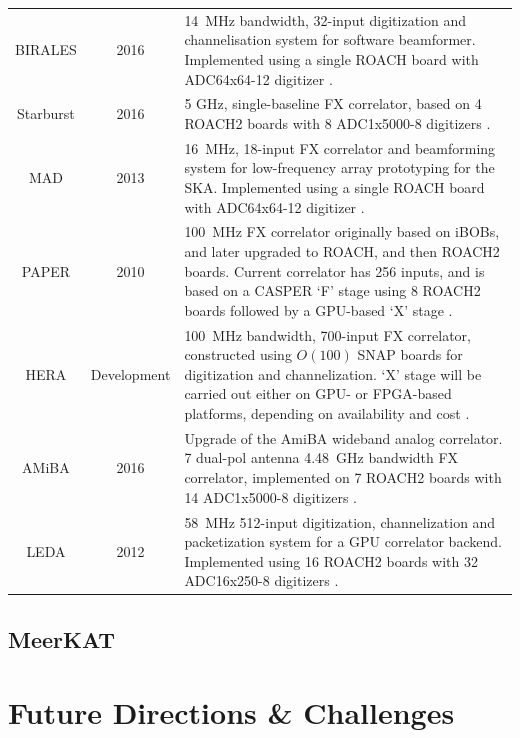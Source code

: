 \documentclass{ws-jai}
\begin{document}
\begin{table}
\begin{tabular}{ccp{10cm}}
  BIRALES          & 2016 & 14~MHz bandwidth, 32-input digitization and channelisation system for software beamformer. Implemented using a single ROACH board with ADC64x64-12 digitizer \citep{7180719}. \\
  Starburst        & 2016 & 5 GHz, single-baseline FX correlator, based on 4 ROACH2 boards with 8 ADC1x5000-8 digitizers \citep{Monroe, private comm}. \\
  MAD              & 2013 & 16~MHz, 18-input FX correlator and beamforming system for low-frequency array prototyping for the SKA. Implemented using a single ROACH board with ADC64x64-12 digitizer \citep{Pupillo2015, RDS:RDS20336}. \\
  PAPER            & 2010 & 100~MHz FX correlator originally based on iBOBs, and later upgraded to ROACH, and then ROACH2 boards. Current correlator has 256 inputs, and is based on a CASPER `F' stage using 8 ROACH2 boards followed by a GPU-based `X' stage \citep{2010AJ....139.1468P, 2014ApJ...788..106P, 2015ApJ...809...61A}. \\
  HERA             & Development & 100~MHz bandwidth, 700-input FX correlator, constructed using $O(100)$ SNAP boards for digitization and channelization. `X' stage will be carried out either on GPU- or FPGA-based platforms, depending on availability and cost \citep{2016arXiv160607473D}. \\
  AMiBA            & 2016 & Upgrade of the AmiBA wideband analog correlator. 7 dual-pol antenna 4.48~GHz bandwidth FX correlator, implemented on 7 ROACH2 boards with 14 ADC1x5000-8 digitizers \citep{amiba-adc, amiba-interim}. \\
  LEDA             & 2012 & 58~MHz 512-input digitization, channelization and packetization system for a GPU correlator backend. Implemented using 16 ROACH2 boards with 32 ADC16x250-8 digitizers \citep{doi:10.1142/S2251171715500038}.\\
  \hline
\end{tabular}
\end{table}


\subsection{MeerKAT}


\section{Future Directions \& Challenges} \label{sec:Future}
\end{document}
